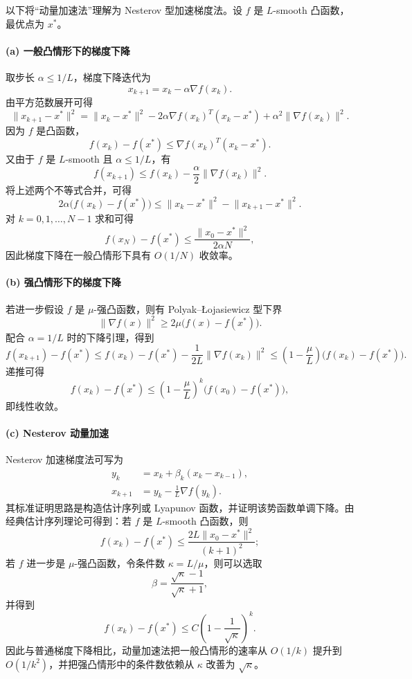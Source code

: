 \documentclass[UTF8,a4paper,12pt,fontset=none]{ctexart}
\begin{document}
以下将“动量加速法”理解为 Nesterov 型加速梯度法。设 $f$ 是 $L$-smooth 凸函数，最优点为 $x^*$。

\paragraph{(a) 一般凸情形下的梯度下降}
取步长 $\alpha\le 1/L$，梯度下降迭代为
\[
x_{k+1}=x_k-\alpha\nabla f(x_k).
\]
由平方范数展开可得
\[
\lVert x_{k+1}-x^*\rVert^2
=\lVert x_k-x^*\rVert^2-2\alpha\nabla f(x_k)^T(x_k-x^*)+\alpha^2\lVert\nabla f(x_k)\rVert^2.
\]
因为 $f$ 是凸函数，
\[
f(x_k)-f(x^*)\le \nabla f(x_k)^T(x_k-x^*).
\]
又由于 $f$ 是 $L$-smooth 且 $\alpha\le 1/L$，有
\[
f(x_{k+1})\le f(x_k)-\frac{\alpha}{2}\lVert\nabla f(x_k)\rVert^2.
\]
将上述两个不等式合并，可得
\[
2\alpha\bigl(f(x_k)-f(x^*)\bigr)
\le \lVert x_k-x^*\rVert^2-\lVert x_{k+1}-x^*\rVert^2.
\]
对 $k=0,1,\ldots,N-1$ 求和可得
\[
f(x_N)-f(x^*)\le \frac{\lVert x_0-x^*\rVert^2}{2\alpha N},
\]
因此梯度下降在一般凸情形下具有 $O(1/N)$ 收敛率。

\paragraph{(b) 强凸情形下的梯度下降}
若进一步假设 $f$ 是 $\mu$-强凸函数，则有 Polyak--Łojasiewicz 型下界
\[
\lVert\nabla f(x)\rVert^2\ge 2\mu\bigl(f(x)-f(x^*)\bigr).
\]
配合 $\alpha=1/L$ 时的下降引理，得到
\[
f(x_{k+1})-f(x^*)
\le f(x_k)-f(x^*)-\frac{1}{2L}\lVert\nabla f(x_k)\rVert^2
\le \left(1-\frac{\mu}{L}\right)\bigl(f(x_k)-f(x^*)\bigr).
\]
递推可得
\[
f(x_k)-f(x^*)\le \left(1-\frac{\mu}{L}\right)^k\bigl(f(x_0)-f(x^*)\bigr),
\]
即线性收敛。

\paragraph{(c) Nesterov 动量加速}
Nesterov 加速梯度法可写为
\[
\begin{aligned}
y_k &= x_k+\beta_k(x_k-x_{k-1}),\\
x_{k+1} &= y_k-\frac1L\nabla f(y_k).
\end{aligned}
\]
其标准证明思路是构造估计序列或 Lyapunov 函数，并证明该势函数单调下降。由经典估计序列理论可得到：若 $f$ 是 $L$-smooth 凸函数，则
\[
f(x_k)-f(x^*)\le \frac{2L\lVert x_0-x^*\rVert^2}{(k+1)^2};
\]
若 $f$ 进一步是 $\mu$-强凸函数，令条件数 $\kappa=L/\mu$，则可以选取
\[
\beta=\frac{\sqrt{\kappa}-1}{\sqrt{\kappa}+1},
\]
并得到
\[
f(x_k)-f(x^*)\le C\left(1-\frac{1}{\sqrt{\kappa}}\right)^k.
\]
因此与普通梯度下降相比，动量加速法把一般凸情形的速率从 $O(1/k)$ 提升到 $O(1/k^2)$，并把强凸情形中的条件数依赖从 $\kappa$ 改善为 $\sqrt{\kappa}$。
\end{document}

